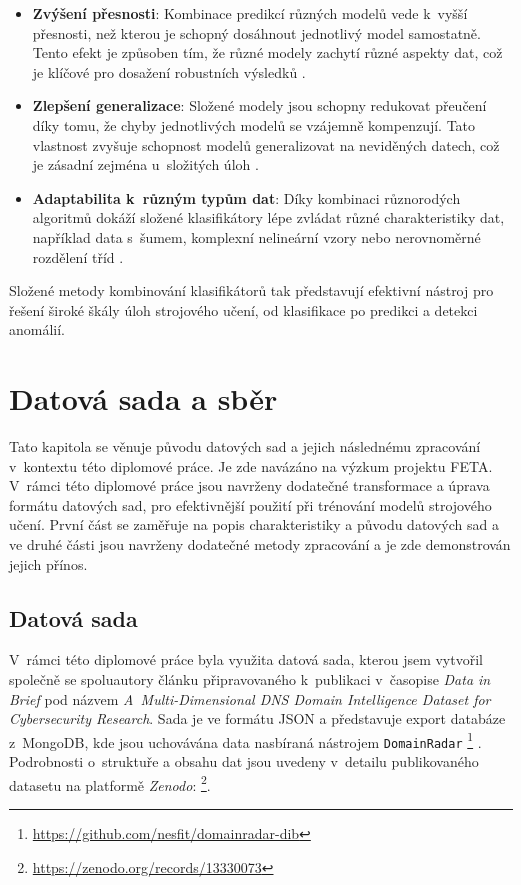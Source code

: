 \begin{itemize}
    \item \textbf{Zvýšení přesnosti}: Kombinace predikcí různých modelů vede k~vyšší přesnosti, než kterou je schopný dosáhnout jednotlivý model samostatně. Tento efekt je způsoben tím, že různé modely zachytí různé aspekty dat, což je klíčové pro dosažení robustních výsledků \cite{nested_learning}.
    
    \item \textbf{Zlepšení generalizace}: Složené modely jsou schopny redukovat přeučení díky tomu, že chyby jednotlivých modelů se vzájemně kompenzují. Tato vlastnost zvyšuje schopnost modelů generalizovat na neviděných datech, což je zásadní zejména u~složitých úloh \cite{multi_stage_classification}.
    
    \item \textbf{Adaptabilita k~různým typům dat}: Díky kombinaci různorodých algoritmů dokáží složené klasifikátory lépe zvládat různé charakteristiky dat, například data s~šumem, komplexní nelineární vzory nebo nerovnoměrné rozdělení tříd \cite{fine_classification}.
\end{itemize}


\noindent Složené metody kombinování klasifikátorů tak představují efektivní nástroj pro řešení široké škály úloh strojového učení, od klasifikace po predikci a detekci anomálií.





\chapter{Datová sada a sběr}
\label{chapter:5}

Tato kapitola se věnuje původu datových sad a jejich následnému zpracování v~kontextu této diplomové práce. Je zde navázáno na výzkum projektu FETA. V~rámci této diplomové práce jsou navrženy dodatečné transformace a úprava formátu datových sad, pro efektivnější použití při trénování modelů strojového učení. První část se zaměřuje na popis charakteristiky a původu datových sad a ve druhé části jsou navrženy dodatečné metody zpracování a je zde demonstrován jejich přínos. 


\section{Datová sada}


V~rámci této diplomové práce byla využita datová sada, kterou jsem vytvořil společně se spoluautory článku připravovaného k~publikaci v~časopise \textit{Data in Brief} pod názvem \textit{A~Multi-Dimensional DNS Domain Intelligence Dataset for Cybersecurity Research}. Sada je ve formátu JSON a představuje export databáze z~MongoDB, kde jsou uchovávána data nasbíraná nástrojem \texttt{DomainRadar} \footnote{\url{https://github.com/nesfit/domainradar-dib}} \cite{domainradar}. Podrobnosti o~struktuře a obsahu dat jsou uvedeny v~detailu publikovaného datasetu na platformě \textit{Zenodo}: \footnote{\url{https://zenodo.org/records/13330073}}.



